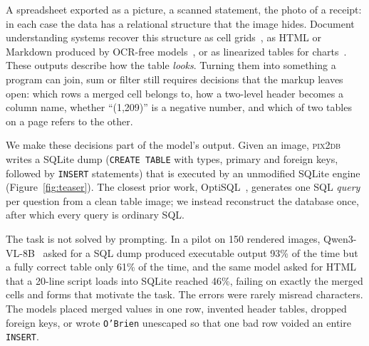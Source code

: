 \documentclass[10pt,twocolumn]{article}
\newcommand{\sys}{\textsc{pix2db}}
\begin{document}
A spreadsheet exported as a picture, a scanned statement, the photo of a receipt: in each case the data has a
relational structure that the image hides. Document understanding systems recover this structure as cell
grids~\citep{zhong2020pubtabnet,smock2022pubtables,nassar2022tableformer}, as HTML or Markdown produced by
OCR-free models~\citep{kim2022donut,lee2023pix2struct,blecher2023nougat,wei2024got,poznanski2025olmocr}, or as
linearized tables for charts~\citep{liu2023deplot}. These outputs describe how the table \emph{looks}. Turning
them into something a program can join, sum or filter still requires decisions that the markup leaves open:
which rows a merged cell belongs to, how a two-level header becomes a column name, whether ``(1,209)'' is a
negative number, and which of two tables on a page refers to the other.

We make these decisions part of the model's output. Given an image, \sys{} writes a SQLite dump
(\texttt{CREATE TABLE} with types, primary and foreign keys, followed by \texttt{INSERT} statements) that is
executed by an unmodified SQLite engine (Figure~\ref{fig:teaser}). The closest prior work,
OptiSQL~\citep{li2026optisql}, generates one SQL \emph{query} per question from a clean table image; we instead
reconstruct the database once, after which every query is ordinary SQL.

The task is not solved by prompting. In a pilot on 150 rendered images, Qwen3-VL-8B~\citep{bai2025qwen3vl} asked
for a SQL dump produced executable output 93\% of the time but a fully correct table only 61\% of the time, and
the same model asked for HTML that a 20-line script loads into SQLite reached 46\%, failing on exactly the
merged cells and forms that motivate the task. The errors were rarely misread characters. The models placed
merged values in one row, invented header tables, dropped foreign keys, or wrote \texttt{O'Brien} unescaped so
that one bad row voided an entire \texttt{INSERT}.
\end{document}
